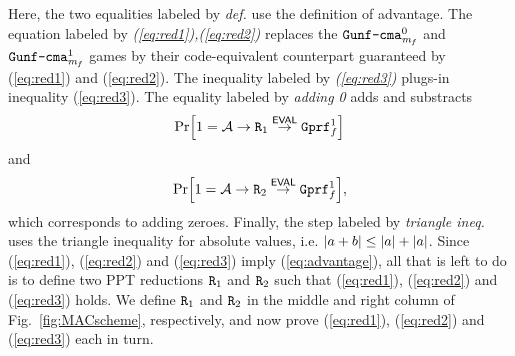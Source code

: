 \documentclass[a4paper,table,dvipsnames]{article}
\theoremstyle{definition}
\newcommand{\M}[1]{\ensuremath{\text{\texttt{#1}}}}
\renewcommand{\O}[1]{\ensuremath{\mathsf{#1}}}
\newcommand{\pcvar}[1]{\ensuremath{\mathit{#1}}}
\newcommand{\m}{\pcvar{m}} %
\begin{document}
Here, the two equalities labeled by \emph{def.} use the definition of
advantage. The equation labeled by \emph{(\ref{eq:red1}),(\ref{eq:red2})}
replaces the $\M{Gunf\text{-}cma}_{\m_f}^0$ and $\M{Gunf\text{-}cma}_{\m_f}^1$
games by their code-equivalent counterpart guaranteed by (\ref{eq:red1}) and (\ref{eq:red2}).
The inequality labeled by \emph{(\ref{eq:red3})} plugs-in inequality (\ref{eq:red3}).
The equality labeled by \emph{adding 0} adds and substracts 
\[\prob{1=\adv\rightarrow\M{R}_1\stackrel{\O{EVAL}}{\rightarrow}\M{Gprf}^1_f}\]
and
\[\prob{1=\adv\rightarrow\M{R}_2\stackrel{\O{EVAL}}{\rightarrow}\M{Gprf}^1_f},\]
which corresponds to adding zeroes. Finally, the step labeled by \emph{triangle ineq.}
uses the triangle inequality for absolute values, i.e. $\left\lvert a+b\right\rvert\leq\left\lvert a\right\rvert+\left\lvert a\right\rvert$.
Since (\ref{eq:red1}), (\ref{eq:red2}) and (\ref{eq:red3}) imply (\ref{eq:advantage}),
all that is left to do is to define two PPT reductions $\M{R}_1$ and $\M{R}_2$ such
that (\ref{eq:red1}), (\ref{eq:red2}) and (\ref{eq:red3}) holds. We define
$\M{R}_1$ and $\M{R}_2$ in the middle and right column of Fig.~\ref{fig:MACscheme}, respectively, and now
prove (\ref{eq:red1}), (\ref{eq:red2}) and (\ref{eq:red3}) each in turn.
\end{document}
